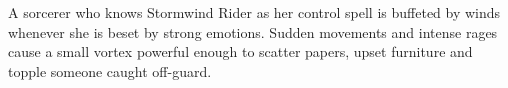 \documentclass[oneside]{book}
\begin{document}
\begin{multicols}{2}
  A sorcerer who knows Stormwind Rider as her control spell is buffeted by winds whenever she is beset by strong emotions. Sudden movements and intense rages cause a small vortex powerful enough to scatter papers, upset furniture and topple someone caught off-guard.

\end{multicols}
\end{document}
